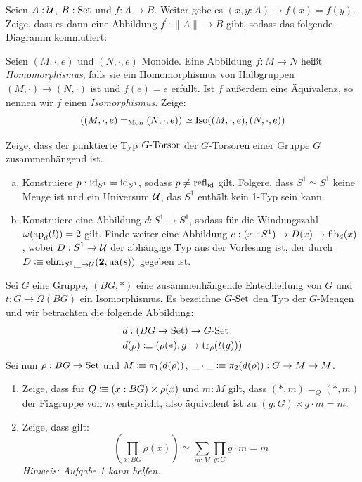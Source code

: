 \documentclass{hott-übung}
\begin{document}
\setcounter{blattnummer}{7}
\setcounter{aufgabennummer}{0}

\blatt

Seien $A:\mathcal{U}$, $B:\mathrm{Set}$ und $f:A\to B$.
Weiter gebe es $(x,y : A)\to f(x)=f(y)$.
Zeige, dass es dann eine Abbildung $f^\prime:\|A\|\to B$ gibt, sodass das folgende Diagramm kommutiert:
\begin{center}
\end{center}

  Seien \((M,\cdot,e)\) und \((N,\cdot,e)\) Monoide.
  Eine Abbildung \(f : M \to N\) heißt \emph{Homomorphismus}, falls sie ein Homomorphismus von Halbgruppen \((M,\cdot) \to (N,\cdot)\) ist und \(f(e)=e\) erfüllt.
  Ist \(f\) außerdem eine Äquivalenz, so nennen wir \(f\) einen \emph{Isomorphismus}.
  Zeige:
  \[((M,\cdot,e) =_{\mathrm{Mon}} (N,\cdot,e)) \simeq \mathrm{Iso}((M,\cdot,e),(N,\cdot,e))\]

\aufgabe{}
Zeige, dass der punktierte Typ \(G\mbox{-}\mathrm{Torsor}\) der \(G\)-Torsoren einer Gruppe \(G\) zusammenhängend ist.

\aufgabe{}
\begin{enumerate}[(a)]
\item Konstruiere $p:\mathrm{id}_{S^1}=\mathrm{id}_{S^1}$, sodass $p\neq \mathrm{refl}_{\mathrm{id}}$ gilt.
Folgere, dass $S^1\simeq S^1$ keine Menge ist und ein Universum $\mathcal{U}$, das $S^1$ enthält kein 1-Typ sein kann.
\item Konstruiere eine Abbildung $d:S^1\to S^1$, sodass für die Windungszahl \(\omega(\mathrm{ap}_d(l))=2\) gilt.
Finde weiter eine Abbildung \(e : (x : S^1) \to D(x) \to \mathrm{fib}_d(x)\), wobei $D:S^1\to\mathcal{U}$ der abhängige Typ aus der Vorlesung ist, der durch $D\vcentcolon\mspace{-1.2mu}\equiv \mathrm{elim}_{S^1,\_\mapsto\mathcal{U}}(\mathbf{2},\mathrm{ua}(s))$ gegeben ist.
\end{enumerate}

\aufgabe{}
  Sei \(G\) eine Gruppe, \((BG,\ast)\) eine zusammenhängende Entschleifung von \(G\) und $t:G\to \Omega(BG)$ ein Isomorphismus.
  Es bezeichne \(G\text{-}\mathrm{Set}\) den Typ der \(G\)-Mengen und wir betrachten die folgende Abbildung:
    \begin{align*}
      &d:(BG\to \mathrm{Set})\to G\text{-}\mathrm{Set} \\
      &d(\rho)\vcentcolon\mspace{-1.2mu}\equiv (\rho(\ast),g\mapsto \mathrm{tr}_\rho(t(g)))
    \end{align*}
    Sei nun $\rho:BG\to\mathrm{Set}$ und $M\vcentcolon\mspace{-1.2mu}\equiv \pi_1(d(\rho))$, $\_\cdot\_\vcentcolon\mspace{-1.2mu}\equiv \pi_2(d(\rho)):G\to M\to M$.
  \begin{enumerate}
  \item Zeige, dass für $Q\vcentcolon\mspace{-1.2mu}\equiv (x:BG)\times \rho(x)$ und $m:M$ gilt, dass $(\ast,m)=_Q(\ast,m)$ der Fixgruppe von $m$ entspricht, also äquivalent ist zu $(g:G)\times g\cdot m=m$.
  \item  Zeige, dass gilt:
    \[
    \left(\prod_{x:BG}\rho(x)\right) \simeq \sum_{m:M}\prod_{g:G}g\cdot m=m
    \]
  \emph{Hinweis: Aufgabe 1 kann helfen.}
  \end{enumerate}
\end{document}
